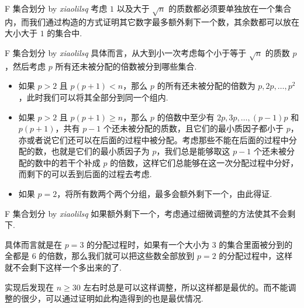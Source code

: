 \begin{frame}{F 集合划分 by \itshape xiaolilsq}
	考虑 $1$ 以及大于 $\sqrt{n}$ 的质数都必须要单独放在一个集合内，而我们通过构造的方式证明其它数字最多额外剩下一个数，其余数都可以放在大小大于 $1$ 的集合中.
\end{frame}

\begin{frame}{F 集合划分 by \itshape xiaolilsq}
	具体而言，从大到小一次考虑每个小于等于 $\sqrt{n}$ 的质数 $p$，然后考虑 $p$ 所有还未被分配的倍数被分到哪些集合. \pause
	
	\begin{itemize}
		\item 如果 $p>2$ 且 $p(p+1)<n$，那么 $p$ 的所有还未被分配的倍数为 $p,2p,\dots,p^2$，此时我们可以将其全部分到同一个组内. \pause
		\item 如果 $p>2$ 且 $p(p+1)\ge n$，那么 $p$ 的倍数中至少有 $2p,3p,\dots,(p-1)p$ 和 $p(p+1)$，共有 $p-1$ 个还未被分配的质数，且它们的最小质因子都小于 $p$，亦或者说它们还可以在后面的过程中被分配。考虑那些不能在后面的过程中分配的数，也就是它们的最小质因子为 $p$，我们总是能够取这 $p-1$ 个还未被分配的数中的若干个补成 $p$ 的倍数，这样它们总能够在这一次分配过程中分好，而剩下的可以丢到后面的过程去考虑. \pause
		\item 如果 $p=2$，将所有数两个两个分组，最多会额外剩下一个，由此得证.
	\end{itemize}
\end{frame}

\begin{frame}{F 集合划分 by \itshape xiaolilsq}
	如果额外剩下一个，考虑通过细微调整的方法使其不会剩下. \pause
	
	具体而言就是在 $p=3$ 的分配过程时，如果有一个大小为 $3$ 的集合里面被分到的全都是 $6$ 的倍数，那么我们就可以把这些数全部放到 $p=2$ 的分配过程中，这样就不会剩下这样一个多出来的了. \pause
	
	实现后发现在 $n\ge 30$ 左右时总是可以这样调整，所以这样都是最优的。而不能调整的很少，可以通过证明如此构造得到的也是最优情况.
	
\end{frame}